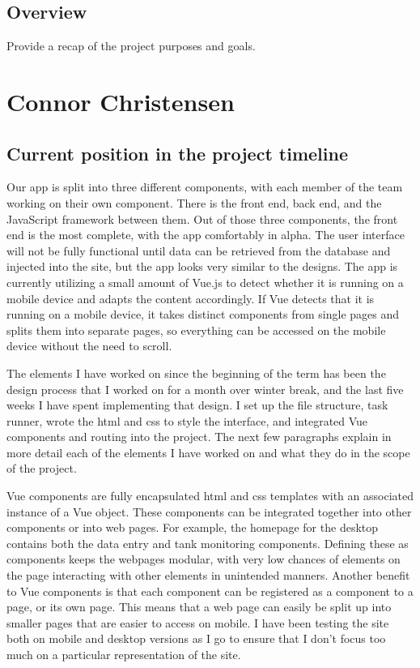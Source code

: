 \documentclass[draftclsnofoot,onecolumn,letterpaper,10pt,compsoc]{IEEEtran}
\begin{document}
\subsection{Overview}
Provide a recap of the project purposes and goals. \\

\section{Connor Christensen}
\subsection{Current position in the project timeline}

Our app is split into three different components, with each member of the team working on their own component. There is the front end, back end, and the JavaScript framework between them.
Out of those three components, the front end is the most complete, with the app comfortably in alpha.
The user interface will not be fully functional until data can be retrieved from the database and injected into the site, but the app looks very similar to the designs.
The app is currently utilizing a small amount of Vue.js to detect whether it is running on a mobile device and adapts the content accordingly.
If Vue detects that it is running on a mobile device, it takes distinct components from single pages and splits them into separate pages, so everything can be accessed on the mobile device without the need to scroll.


The elements I have worked on since the beginning of the term has been the design process that I worked on for a month over winter break, and the last five weeks I have spent implementing that design.
I set up the file structure, task runner, wrote the html and css to style the interface, and integrated Vue components and routing into the project.
The next few paragraphs explain in more detail each of the elements I have worked on and what they do in the scope of the project.


Vue components are fully encapsulated html and css templates with an associated instance of a Vue object.
These components can be integrated together into other components or into web pages.
For example, the homepage for the desktop contains both the data entry and tank monitoring components.
Defining these as components keeps the webpages modular, with very low chances of elements on the page interacting with other elements in unintended manners.
Another benefit to Vue components is that each component can be registered as a component to a page, or its own page.
This means that a web page can easily be split up into smaller pages that are easier to access on mobile.
I have been testing the site both on mobile and desktop versions as I go to ensure that I don't focus too much on a particular representation of the site.
\end{document}
